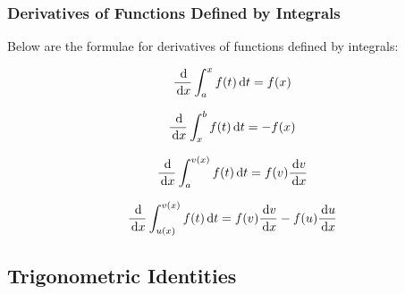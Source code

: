 \documentclass[a4paper,12pt]{article}
\begin{document}
\subsubsection{Derivatives of Functions Defined by Integrals}
\begin{pst}
  Below are the formulae for derivatives of functions defined by integrals:

  \begin{alist}
    \item

    $$\frac{\,\mathrm{d}}{\,\mathrm{d} x}\int_{a}^{x}f(t)\,\mathrm{d} t=f(x)$$

    \item

    $$\frac{\,\mathrm{d}}{\,\mathrm{d} x}\int_{x}^{b}f(t)\,\mathrm{d} t=-f(x)$$

    \item

    $$\frac{\,\mathrm{d}}{\,\mathrm{d} x}\int_{a}^{v(x)}f(t)\,\mathrm{d} t=f(v)\frac{\,\mathrm{d} v}{\,\mathrm{d} x}$$

    \item

    $$\frac{\,\mathrm{d}}{\,\mathrm{d} x}\int_{u(x)}^{v(x)}f(t)\,\mathrm{d} t=f(v)\frac{\,\mathrm{d} v}{\,\mathrm{d} x}-f(u)\frac{\,\mathrm{d} u}{\,\mathrm{d} x}$$
  \end{alist}
\end{pst}

\subsection{Trigonometric Identities}
\end{document}

